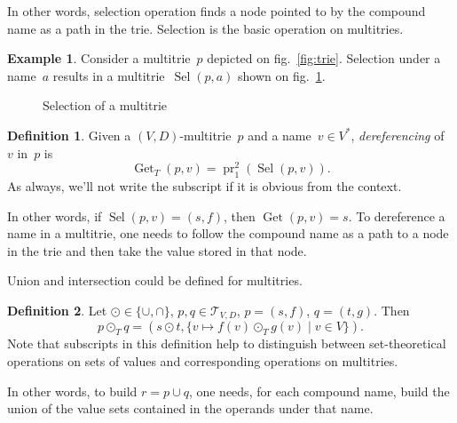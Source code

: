 \documentclass{article}
\theoremstyle{definition}
\newtheorem{Df}{Definition}
\newtheorem{Ex}{Example}
\newcommand{\setcharmt}{T}
\newcommand{\setsymbol}[3]{\mathcal{#1}_{#2,#3}}
\newcommand{\setmt}[2]{\setsymbol{\setcharmt}{#1}{#2}}
\newcommand{\select}{\operatorname{Sel}}
\newcommand{\deref}{\operatorname{Get}}
\newcommand{\proj}[2]{\operatorname{pr}^{#1}_{#2}}
\begin{document}
In other words, selection operation finds a node pointed to by the
compound name as a path in the trie.
Selection is the basic operation on multitries.

\begin{Ex}\label{ex:mt-select}
Consider a multitrie~$p$ depicted on fig.~\ref{fig:trie}. Selection under a
name~$a$ results in a multitrie~$\select(p,a)$ shown on
fig.~\ref{fig:mt-select}.
\end{Ex}

\begin{figure}[ht]
\begin{center}
\begin{minipage}{17em}
\end{minipage}
\end{center}
\caption{Selection of a multitrie}\label{fig:mt-select}
\end{figure}

\begin{Df}\label{df:mt-deref}
Given a $(V,D)$-multitrie~$p$ and a name~$v\in V^\ast$, \emph{dereferencing}
of~$v$ in~$p$ is
\[
  \deref_\setcharmt(p, v) = \proj{2}{1}(\select(p, v)) .
\]
As always, we'll not write the subscript if it is obvious from the context.
\end{Df}

In other words, if $\select(p,v) = (s,f)$, then $\deref(p, v) = s$. To
dereference a name in a multitrie, one needs to follow the compound name
as a path to a node in the trie and then take the value stored in that node.

Union and intersection could be defined for multitries.
\begin{Df}\label{df:mt-setop}
Let $\odot \in \{ \cup, \cap \}$, $p, q \in \setmt{V}{D}$,
$p = (s,f)$, $q = (t, g)$. Then
\[
  p \odot_\setcharmt  q = (s \odot t, \{ v \mapsto f(v) \odot_\setcharmt  g(v) \mid v \in V \}) .
\]
Note that subscripts in this definition help to distinguish between
set-theoretical operations on sets of values and corresponding operations
on multitries.
\end{Df}

In other words, to build $r = p \cup q$, one needs, for each compound name,
build the union of the value sets contained in the operands under that name.
\end{document}
